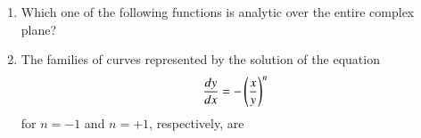 \documentclass[a4paper, 11pt]{article}
\begin{document}
\begin{enumerate}

    
    \item Which one of the following functions is analytic over the entire complex plane?

    \begin{enumerate}
    \end{enumerate}

    \hfill{}

    \item The families of curves represented by the solution of the equation
    \[
    \frac{dy}{dx}=-\left(\frac{x}{y}\right)^{n}
    \]
    for $n=-1$ and $n=+1$, respectively, are
    \begin{enumerate}
    \end{enumerate}

    \hfill{}


\end{enumerate}
\end{document}
